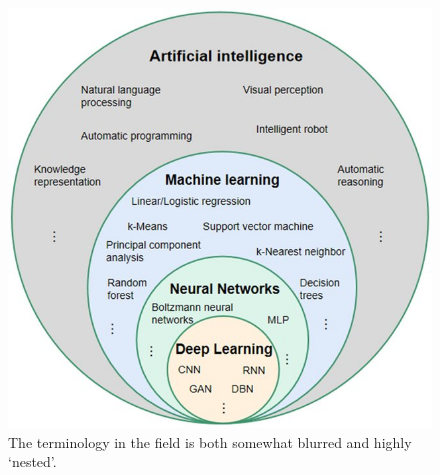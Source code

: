 \begin{figure}[ht]\centering 	\includegraphics{ai}
	\caption{The terminology in the field is both somewhat blurred and highly `nested'.}
	\label{fig:aiVenn}
\end{figure}

